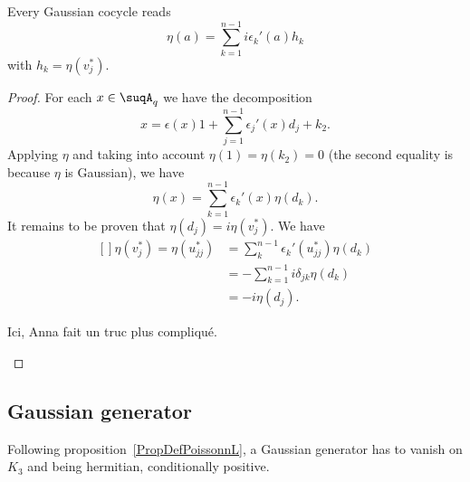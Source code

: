 \begin{proposition}     \label{PropGaussCocycle}
    Every Gaussian cocycle reads
    \begin{equation}
        \eta(a)=\sum_{k=1}^{n-1}i\epsilon_k'(a)h_k
    \end{equation}
    with $h_k=\eta(v_j^*)$.
\end{proposition}

\begin{proof}
    For each $x\in\suqA_q$ we have the decomposition
    \begin{equation}
        x=\epsilon(x)1+\sum_{j=1}^{n-1}\epsilon_j'(x)d_j+k_2.
    \end{equation}
    Applying $\eta$ and taking into account $\eta(1)=\eta(k_2)=0$ (the second equality is because $\eta$ is Gaussian), we have
    \begin{equation}
        \eta(x)=\sum_{k=1}^{n-1}\epsilon_k'(x)\eta(d_k).
    \end{equation}
    It remains to be proven that $\eta(d_j)=i\eta(v_j^*)$. We have
    \begin{equation}
        \begin{aligned}[]
            \eta(v_j^*)=\eta(u_{jj}^*)&=\sum_k^{n-1}\epsilon_k'(u_{jj}^*)\eta(d_k)\\
            &=-\sum_{k=1}^{n-1}i\delta_{jk}\eta(d_k)\\
            &=-i\eta(d_j).
        \end{aligned}
    \end{equation}
    \begin{probleme}
        Ici, Anna fait un truc plus compliqué.
    \end{probleme}

\end{proof}

\subsection{Gaussian generator}

Following proposition~\ref{PropDefPoissonnL}, a Gaussian generator has to vanish on $K_3$ and being hermitian, conditionally positive.

